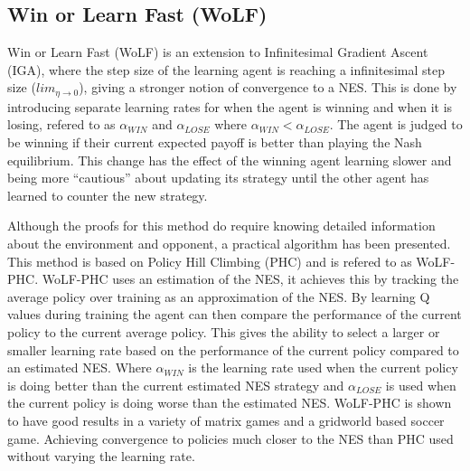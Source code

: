 \documentclass[conference]{IEEEtran}
\newcommand\REVIEW[1]{{\color{blue} #1}}
\begin{document}

\subsection{Win or Learn Fast (WoLF)}

Win or Learn Fast (WoLF) is an extension to Infinitesimal Gradient Ascent (IGA), where the step size of the learning agent is reaching a infinitesimal step size ($lim_{\eta \to 0}$)\cite{singh2000nash}, giving a stronger notion of convergence to a NES. This is done by introducing separate learning rates for when the agent is winning and when it is losing, refered to as $\alpha_{WIN}$ and $\alpha_{LOSE}$ where $\alpha_{WIN} < \alpha_{LOSE}$. The agent is judged to be winning if their current expected payoff is better than playing the Nash equilibrium. This change has the effect of the winning agent learning slower and being more ``cautious'' about updating its strategy until the other agent has learned to counter the new strategy.

Although the proofs for this method do require knowing detailed information about the environment and opponent, a practical algorithm has been presented\cite{bowling2002multiagent}. This method is based on Policy Hill Climbing (PHC) and is refered to as WoLF-PHC. \REVIEW{WoLF-PHC uses an estimation of the NES, it achieves this by tracking the average policy over training as an approximation of the NES. By learning Q values during training the agent can then compare the performance of the current policy to the current average policy. This gives the ability to select a larger or smaller learning rate based on the performance of the current policy compared to an estimated NES. Where $\alpha_{WIN}$ is the learning rate used when the current policy is doing better than the current estimated NES strategy and $\alpha_{LOSE}$ is used when the current policy is doing worse than the estimated NES. WoLF-PHC is shown to have good results in a variety of matrix games and a gridworld based soccer game. Achieving convergence to policies much closer to the NES than PHC used without varying the learning rate.}
\end{document}
